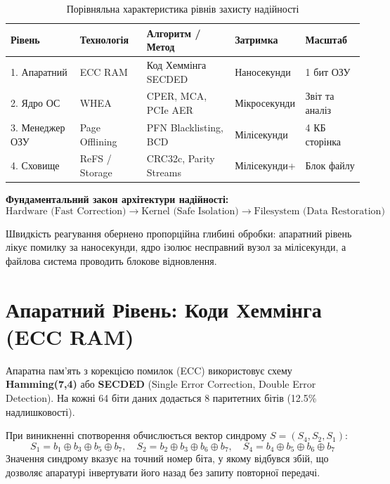 \documentclass[12pt,a4paper]{article}
\begin{document}
\begin{table}[h!]
\centering
\caption{Порівняльна характеристика рівнів захисту надійності}
\label{tab:levels}
\begin{tabular}{@{}lllll@{}}
\toprule
\textbf{Рівень} & \textbf{Технологія} & \textbf{Алгоритм / Метод} & \textbf{Затримка} & \textbf{Масштаб} \\ \midrule
1. Апаратний & ECC RAM & Код Хеммінга SECDED & Наносекунди & 1 бит ОЗУ \\
2. Ядро ОС & WHEA & CPER, MCA, PCIe AER & Мікросекунди & Звіт та аналіз \\
3. Менеджер ОЗУ & Page Offlining & PFN Blacklisting, BCD & Мілісекунди & 4 КБ сторінка \\
4. Сховище & ReFS / Storage & CRC32c, Parity Streams & Мілісекунди+ & Блок файлу \\ \bottomrule
\end{tabular}
\end{table}

\textbf{Фундаментальний закон архітектури надійності:}
\begin{equation}
\text{Hardware (Fast Correction)} \longrightarrow \text{Kernel (Safe Isolation)} \longrightarrow \text{Filesystem (Data Restoration)}
\end{equation}

Швидкість реагування обернено пропорційна глибині обробки: апаратний рівень лікує помилку за наносекунди, ядро ізолює несправний вузол за мілісекунди, а файлова система проводить блокове відновлення.

\section{Апаратний Рівень: Коди Хеммінга (ECC RAM)}
Апаратна пам'ять з корекцією помилок (ECC) використовує схему \textbf{Hamming(7,4)} або \textbf{SECDED} (Single Error Correction, Double Error Detection). На кожні 64 біти даних додається 8 паритетних бітів (12.5\% надлишковості).

При виникненні спотворення обчислюється вектор синдрому $S = (S_4, S_2, S_1)$:
\begin{equation}
S_1 = b_1 \oplus b_3 \oplus b_5 \oplus b_7, \quad
S_2 = b_2 \oplus b_3 \oplus b_6 \oplus b_7, \quad
S_4 = b_4 \oplus b_5 \oplus b_6 \oplus b_7
\end{equation}
Значення синдрому вказує на точний номер біта, у якому відбувся збій, що дозволяє апаратурі інвертувати його назад без запиту повторної передачі.
\end{document}
